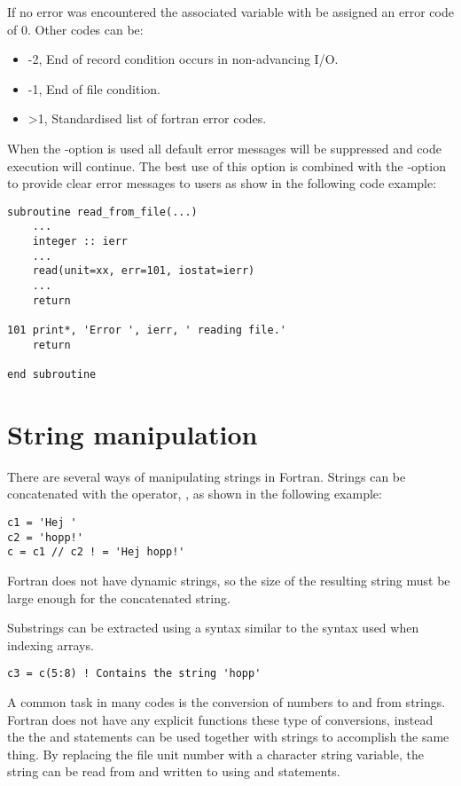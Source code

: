 If no error was encountered the associated variable with be assigned an error code of 0. Other codes can be:

\begin{itemize}
\item -2, End of record condition occurs in non-advancing I/O.
\item -1, End of file condition. 
\item >1, Standardised list of fortran error codes.
\end{itemize}


When the -option is used all default error messages will be suppressed and code execution will continue. The best use of this option is combined with the -option to provide clear error messages to users as show in the following code example:

\begin{lstlisting}
subroutine read_from_file(...)
    ...
    integer :: ierr
    ...
    read(unit=xx, err=101, iostat=ierr)
    ...
    return

101 print*, 'Error ', ierr, ' reading file.' 
    return
    
end subroutine
\end{lstlisting}

\section{String manipulation}

There are several ways of manipulating strings in Fortran. Strings can be concatenated with the operator, \foper{//}, as shown in the following example:

\begin{lstlisting}
c1 = 'Hej '
c2 = 'hopp!'
c = c1 // c2 ! = 'Hej hopp!'
\end{lstlisting}

Fortran does not have dynamic strings, so the size of the resulting string must be large enough for the concatenated string.

Substrings can be extracted using a syntax similar to the syntax used when indexing arrays.

\begin{lstlisting}
c3 = c(5:8) ! Contains the string 'hopp'
\end{lstlisting}

A common task in many codes is the conversion of numbers to and from strings. Fortran does not have any explicit functions these type of conversions, instead the the  and  statements can be used together with strings to accomplish the same thing. By replacing the file unit number with a character string variable, the string can be read from and written to using  and  statements.

